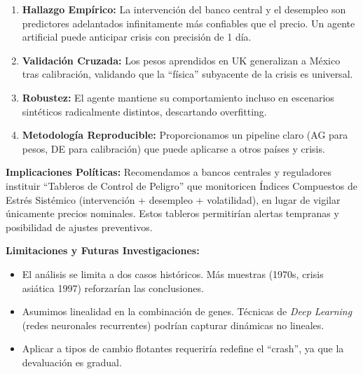 \begin{enumerate}
    \item \textbf{Hallazgo Empírico:} La intervención del banco central y el desempleo son predictores adelantados infinitamente más confiables que el precio. Un agente artificial puede anticipar crisis con precisión de 1 día.
    \item \textbf{Validación Cruzada:} Los pesos aprendidos en UK generalizan a México tras calibración, validando que la ``física'' subyacente de la crisis es universal.
    \item \textbf{Robustez:} El agente mantiene su comportamiento incluso en escenarios sintéticos radicalmente distintos, descartando overfitting.
    \item \textbf{Metodología Reproducible:} Proporcionamos un pipeline claro (AG para pesos, DE para calibración) que puede aplicarse a otros países y crisis.
\end{enumerate}

\noindent
\textbf{Implicaciones Políticas:} Recomendamos a bancos centrales y reguladores instituir ``Tableros de Control de Peligro'' que monitoricen Índices Compuestos de Estrés Sistémico (intervención + desempleo + volatilidad), en lugar de vigilar únicamente precios nominales. Estos tableros permitirían alertas tempranas y posibilidad de ajustes preventivos.

\textbf{Limitaciones y Futuras Investigaciones:} 
\begin{itemize}
    \item El análisis se limita a dos casos históricos. Más muestras (1970s, crisis asiática 1997) reforzarían las conclusiones.
    \item Asumimos linealidad en la combinación de genes. Técnicas de \textit{Deep Learning} (redes neuronales recurrentes) podrían capturar dinámicas no lineales.
    \item Aplicar a tipos de cambio flotantes requeriría redefine el ``crash'', ya que la devaluación es gradual.
\end{itemize}